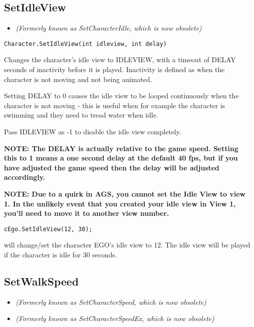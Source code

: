 \subsection{SetIdleView}\label{Character.SetIdleView}%

\begin{itemize}
\item \it{(Formerly known as SetCharacterIdle, which is now obsolete)}
\end{itemize}

\begin{verbatim}
Character.SetIdleView(int idleview, int delay)
\end{verbatim}
Changes the character's idle view to IDLEVIEW, with a timeout of DELAY seconds
of inactivity before it is played. Inactivity is defined as when the character
is not moving and not being animated.

Setting DELAY to 0 causes the idle view to be looped continuously when
the character is not moving - this is useful when for example the character
is swimming and they need to tread water when idle.

Pass IDLEVIEW as -1 to disable the idle view completely.

\bf{NOTE:} The DELAY is actually relative to the game speed. Setting this to 1 means
a one second delay at the default 40 fps, but if you have adjusted the game speed then
the delay will be adjusted accordingly.

\bf{NOTE:} Due to a quirk in AGS, you cannot set the Idle View to view 1. In the unlikely event that you
created your idle view in View 1, you'll need to move it to another view number.

\begin{verbatim}
cEgo.SetIdleView(12, 30);
\end{verbatim}
will change/set the character EGO's idle view to 12. The idle view will be
played if the character is idle for 30 seconds.


\subsection{SetWalkSpeed}\label{Character.SetWalkSpeed}%

\begin{itemize}
\item \it{(Formerly known as SetCharacterSpeed, which is now obsolete)}
\item \it{(Formerly known as SetCharacterSpeedEx, which is now obsolete)}
\end{itemize}

